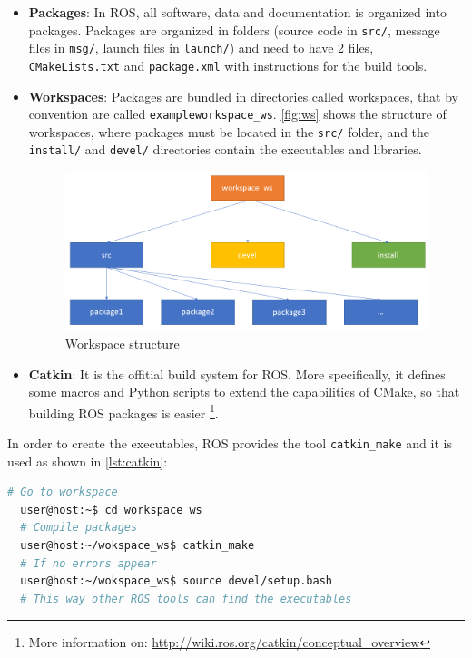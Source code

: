 \begin{itemize}
  \item \textbf{Packages}: In ROS, all software, data and documentation is organized into packages. Packages are organized in folders (source code in \texttt{src/}, message files in \texttt{msg/}, launch files in \texttt{launch/}) and need to have 2 files, \texttt{CMakeLists.txt} and \texttt{package.xml} with instructions for the build tools.

  \item \textbf{Workspaces}: Packages are bundled in directories called workspaces, that by convention are called \texttt{exampleworkspace\_ws}. \autoref{fig:ws} shows the structure of workspaces, where packages must be located in the \texttt{src/} folder, and the \texttt{install/} and \texttt{devel/} directories contain the executables and libraries.

  \begin{figure}[htb]
    \centering
    \includegraphics[width=.8\linewidth]{pictures/02/ws}
    \caption{Workspace structure}
    \label{fig:ws}
  \end{figure}

  \item \textbf{Catkin}: It is the offitial build system for ROS. More specifically, it defines some macros and Python scripts to extend the capabilities of CMake, so that building ROS packages is easier \footnote{More information on: \url{http://wiki.ros.org/catkin/conceptual_overview}}. 
\end{itemize}

In order to create the executables, ROS provides the tool \texttt{catkin\_make} and it is used as shown in \autoref{lst:catkin}:
\begin{lstlisting}[float=htb,language=bash,frame=htb,caption={Use of catkin\_make},label=lst:catkin] 
  # Go to workspace
  user@host:~$ cd workspace_ws 
  # Compile packages
  user@host:~/wokspace_ws$ catkin_make 
  # If no errors appear
  user@host:~/wokspace_ws$ source devel/setup.bash
  # This way other ROS tools can find the executables
\end{lstlisting}

